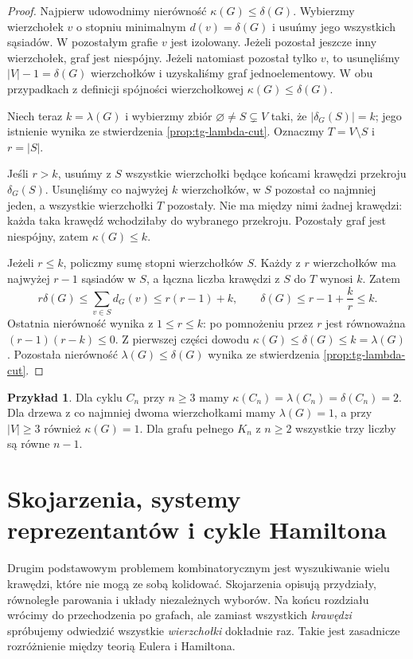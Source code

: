 \documentclass[11pt,a4paper]{report}
\numberwithin{equation}{section}
\theoremstyle{plain}
\theoremstyle{definition}
\newtheorem{przyklad}[twierdzenie]{Przykład}
\theoremstyle{remark}
\begin{document}
\begin{proof}
Najpierw udowodnimy nierówność $\kappa(G)\le\delta(G)$.
Wybierzmy wierzchołek $v$ o stopniu minimalnym
$d(v)=\delta(G)$ i usuńmy jego wszystkich sąsiadów.
W pozostałym grafie $v$ jest izolowany. Jeżeli pozostał
jeszcze inny wierzchołek, graf jest niespójny.
Jeżeli natomiast pozostał tylko $v$, to usunęliśmy
$|V|-1=\delta(G)$ wierzchołków i uzyskaliśmy
graf jednoelementowy. W obu przypadkach z definicji
spójności wierzchołkowej $\kappa(G)\le\delta(G)$.

Niech teraz $k=\lambda(G)$ i wybierzmy zbiór
$\varnothing\ne S\subsetneq V$ taki, że
$|\delta_G(S)|=k$; jego istnienie wynika ze
stwierdzenia \ref{prop:tg-lambda-cut}. Oznaczmy
$T=V\setminus S$ i $r=|S|$.

Jeśli $r>k$, usuńmy z $S$ wszystkie wierzchołki
będące końcami krawędzi przekroju $\delta_G(S)$.
Usunęliśmy co najwyżej $k$ wierzchołków,
w $S$ pozostał co najmniej jeden, a wszystkie
wierzchołki $T$ pozostały. Nie ma między nimi
żadnej krawędzi: każda taka krawędź wchodziłaby
do wybranego przekroju. Pozostały graf jest
niespójny, zatem $\kappa(G)\le k$.

Jeżeli $r\le k$, policzmy sumę stopni wierzchołków $S$.
Każdy z $r$ wierzchołków ma najwyżej $r-1$
sąsiadów w $S$, a łączna liczba krawędzi
z $S$ do $T$ wynosi $k$. Zatem
\[
r\delta(G)\le\sum_{v\in S}d_G(v)\le r(r-1)+k,
\qquad
\delta(G)\le r-1+\frac{k}{r}\le k.
\]
Ostatnia nierówność wynika z $1\le r\le k$:
po pomnożeniu przez $r$ jest równoważna
$(r-1)(r-k)\le0$. Z pierwszej części dowodu
$\kappa(G)\le\delta(G)\le k=\lambda(G)$.
Pozostała nierówność $\lambda(G)\le\delta(G)$
wynika ze stwierdzenia \ref{prop:tg-lambda-cut}.
\end{proof}



\begin{przyklad}
Dla cyklu $C_n$ przy $n\ge3$ mamy
$\kappa(C_n)=\lambda(C_n)=\delta(C_n)=2$.
Dla drzewa z co najmniej dwoma wierzchołkami mamy
$\lambda(G)=1$, a przy $|V|\ge3$ również $\kappa(G)=1$.
Dla grafu pełnego $K_n$ z $n\ge2$ wszystkie trzy
liczby są równe $n-1$.
\end{przyklad}

\chapter{Skojarzenia, systemy reprezentantów i cykle Hamiltona}
\label{ch:tg-skojarzenia}

Drugim podstawowym problemem kombinatorycznym jest wyszukiwanie
wielu krawędzi, które nie mogą ze sobą kolidować. Skojarzenia
opisują przydziały, równoległe parowania i układy niezależnych
wyborów. Na końcu rozdziału wrócimy do przechodzenia po grafach,
ale zamiast wszystkich \emph{krawędzi} spróbujemy odwiedzić
wszystkie \emph{wierzchołki} dokładnie raz. Takie jest
zasadnicze rozróżnienie między teorią Eulera i Hamiltona.
\end{document}
